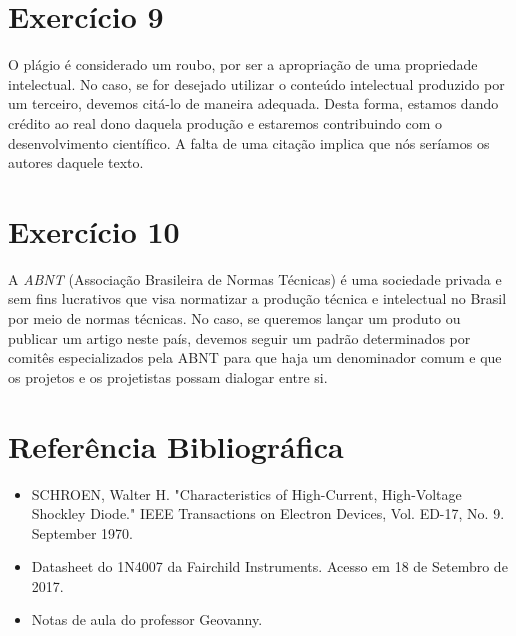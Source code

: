 \documentclass[12pt, a4paper, twoside]{article}
\begin{document}
\section{Exercício 9}

O plágio é considerado um roubo, por ser a apropriação de uma propriedade intelectual.
No caso, se for desejado utilizar o conteúdo intelectual produzido por um terceiro,
devemos citá-lo de maneira adequada. Desta forma, estamos dando crédito ao real dono
daquela produção e estaremos contribuindo com o desenvolvimento científico. A falta de
uma citação implica que nós seríamos os autores daquele texto.

\section{Exercício 10}

A \textit{ABNT} (Associação Brasileira de Normas Técnicas) é uma sociedade privada e
sem fins lucrativos que visa normatizar a produção técnica e intelectual no Brasil por
meio de normas técnicas. No caso, se queremos lançar um produto ou publicar um artigo
neste país, devemos seguir um padrão determinados por comitês especializados pela ABNT
para que haja um denominador comum e que os projetos e os projetistas possam dialogar
entre si.

\section{Referência Bibliográfica}

\begin{itemize}
    \item SCHROEN, Walter H. "Characteristics of High-Current, High-Voltage Shockley
    Diode." IEEE Transactions on Electron Devices, Vol. ED-17, No. 9. September 1970.
    \item Datasheet do 1N4007 da Fairchild Instruments. Acesso em 18 de Setembro de
    2017.
    \item Notas de aula do professor Geovanny.
\end{itemize}
\end{document}
